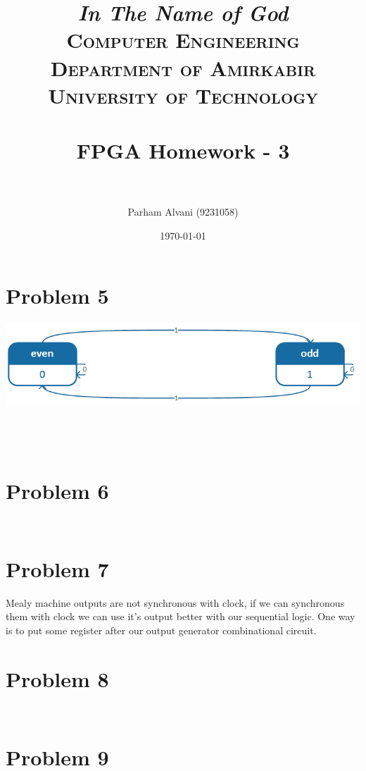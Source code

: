 \documentclass[paper=a4, fontsize=11pt]{scrartcl} %
\title{
\normalfont \normalsize
\textit{In The Name of God} \\
\textsc{Computer Engineering Department of Amirkabir University of Technology} \\ [25pt]
\horrule{0.5pt} \\[0.4cm] %
\huge FPGA Homework - 3 \\ %
\horrule{2pt} \\[0.5cm] %
}
\author{Parham Alvani (9231058)}
\date{\normalsize\today}
\numberwithin{equation}{section} %
\numberwithin{figure}{section} %
\numberwithin{table}{section} %
\begin{document}
\maketitle


\section{Problem 5}
\center\includegraphics[]{p5.png}
\inputminted{vhdl}{src/p5/parity-generator.vhd}
\inputminted{vhdl}{src/p5/shift-register.vhd}
\inputminted{vhdl}{src/p5/p5_t.vhd}
\inputminted{vhdl}{src/p5/p5.vhd}


\section{Problem 6}
\inputminted{vhdl}{src/p6/p6-2.vhd}
\inputminted{vhdl}{src/p6/p6-3.vhd}


\section{Problem 7}
\par Mealy machine outputs are not synchronous with clock, if we
can synchronous them with clock we can use it's output better with
our sequential logic. One way is to put some register after our output
generator combinational circuit.


\section{Problem 8}
\inputminted{vhdl}{src/p8/p8.vhd}
\inputminted{vhdl}{src/p8/p8_t.vhd}


\section{Problem 9}
\inputminted{vhdl}{src/p9/p9.vhd}

\end{document}

